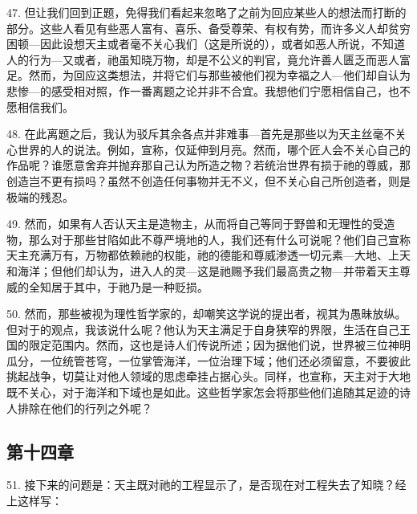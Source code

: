 47. 但让我们回到正题，免得我们看起来忽略了之前为回应某些人的想法而打断的部分。这些人看见有些恶人富有、喜乐、备受尊荣、有权有势，而许多义人却贫穷困顿---因此设想天主或者毫不关心我们（这是所说的），或者如恶人所说，不知道人的行为---又或者，祂虽知晓万物，却是不公义的判官，竟允许善人匮乏而恶人富足。然而，为回应这类想法，并将它们与那些被他们视为幸福之人---他们却自认为悲惨---的感受相对照，作一番离题之论并非不合宜。我想他们宁愿相信自己，也不愿相信我们。\par

48. 在此离题之后，我认为驳斥其余各点并非难事---首先是那些以为天主丝毫不关心世界的人的说法。例如，宣称，仅延伸到月亮。然而，哪个匠人会不关心自己的作品呢？谁愿意舍弃并抛弃那自己认为所造之物？若统治世界有损于祂的尊威，那创造岂不更有损吗？虽然不创造任何事物并无不义，但不关心自己所创造者，则是极端的残忍。\par

49. 然而，如果有人否认天主是造物主，从而将自己等同于野兽和无理性的受造物，那么对于那些甘陷如此不尊严境地的人，我们还有什么可说呢？他们自己宣称天主充满万有，万物都依赖祂的权能，祂的德能和尊威渗透一切元素---大地、上天和海洋；但他们却认为，进入人的灵---这是祂赐予我们最高贵之物---并带着天主尊威的全知居于其中，于祂乃是一种贬损。\par

50. 然而，那些被视为理性哲学家的，却嘲笑这学说的提出者，视其为愚昧放纵。但对于的观点，我该说什么呢？他认为天主满足于自身狭窄的界限，生活在自己王国的限定范围内。然而，这也是诗人们传说所述；因为据他们说，世界被三位神明瓜分，一位统管苍穹，一位掌管海洋，一位治理下域；他们还必须留意，不要彼此挑起战争，切莫让对他人领域的思虑牵挂占据心头。同样，也宣称，天主对于大地既不关心，对于海洋和下域也是如此。这些哲学家怎会将那些他们追随其足迹的诗人排除在他们的行列之外呢？\par


\subsection{第十四章}

\par

51. 接下来的问题是：天主既对祂的工程显示了，是否现在对工程失去了知晓？经上这样写：\par

